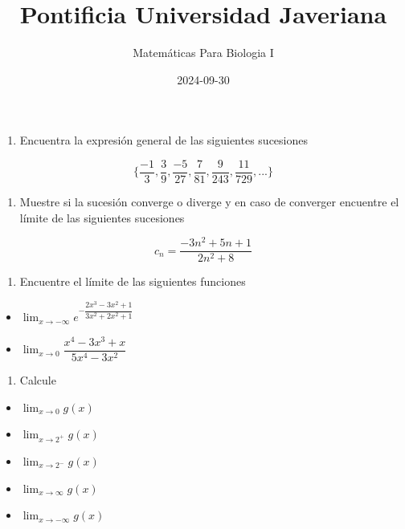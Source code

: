 \documentclass[
]{article}
\title{Pontificia Universidad Javeriana}
\author{Matemáticas Para Biologia I}
\date{2024-09-30}
\providecommand{\tightlist}{%
  \setlength{\itemsep}{0pt}\setlength{\parskip}{0pt}}\usepackage{longtable,booktabs,array}
\begin{document}
\maketitle


\begin{enumerate}
\def\labelenumi{\arabic{enumi}.}
\tightlist
\item
  Encuentra la expresión general de las siguientes sucesiones
\end{enumerate}

\[\Big\{\frac{-1}{3},\frac{3}{9},\frac{-5}{27},\frac{7}{81},\frac{9}{243},\frac{11}{729},... \Big\}\]

\begin{enumerate}
\def\labelenumi{\arabic{enumi}.}
\setcounter{enumi}{1}
\tightlist
\item
  Muestre si la sucesión converge o diverge y en caso de converger
  encuentre el límite de las siguientes sucesiones
\end{enumerate}

\[c_n = \dfrac{-3n^2+5n+1}{2n^2+8}\]

\begin{enumerate}
\def\labelenumi{\arabic{enumi}.}
\setcounter{enumi}{2}
\tightlist
\item
  Encuentre el límite de las siguientes funciones
\end{enumerate}

\begin{itemize}
\item
  \(\lim_{x\to -\infty} e^{-\dfrac{2x^3-3x^2+1}{3x^2+2x^2+1}}\)
\item
  \(\lim_{x\to 0} \dfrac{x^4-3x^3+x}{5x^4-3x^2}\)
\end{itemize}

\begin{enumerate}
\def\labelenumi{\arabic{enumi}.}
\setcounter{enumi}{3}
\tightlist
\item
  Calcule
\end{enumerate}

\begin{itemize}
\item
  \(\lim_{x\to 0}g(x)\)
\item
  \(\lim_{x\to 2^+}g(x)\)
\item
  \(\lim_{x\to 2^-}g(x)\)
\item
  \(\lim_{x\to \infty}g(x)\)
\item
  \(\lim_{x\to -\infty}g(x)\)
\end{itemize}
\end{document}

